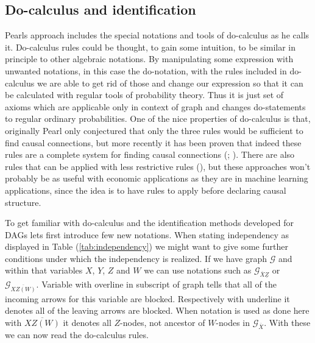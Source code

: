 \documentclass[main=english,12pt,a4paper,pdftex,econ,utf8]{aaltothesis}
\newcommand{\g}{\mathcal{G}}
\begin{document}
\subsection{Do-calculus and identification}

Pearls approach includes the special notations and tools of do-calculus as he calls it. Do-calculus rules could be thought, to gain some intuition, to be similar in principle to other algebraic notations. By manipulating some expression with unwanted notations, in this case the do-notation, with the rules included in do-calculus we are able to get rid of those and change our expression so that it can be calculated with regular tools of probability theory. Thus it is just set of axioms which are applicable only in context of graph and changes do-statements to regular ordinary probabilities. One of the nice properties of do-calculus is that, originally Pearl only conjectured that only the three rules would be sufficient to find causal connections, but more recently it has been proven that indeed these rules are a complete system for finding causal connections (\cite{Shpitser2006}; \cite{Huang2006}). There are also rules that can be applied with less restrictive rules (\cite{Hyttinen2015}), but these approaches won't probably be as useful with economic applications as they are in machine learning applications, since the idea is to have rules to apply before declaring causal structure.

To get familiar with do-calculus and the identification methods developed for DAGs lets first introduce few new notations. When stating independency as displayed in Table (\ref{tab:independency}) we might want to give some further conditions under which the independency is realized. If we have graph $\g$ and within that variables $X$, $Y$, $Z$ and $W$ we can use notations such as $\g_{\overline{X}\underline{Z}}$ or $\g_{\overline{XZ(W)}}$. Variable with overline in subscript of graph tells that all of the incoming arrows for this variable are blocked. Respectively with underline it denotes all of the leaving arrows are blocked. When notation is used as done here with $\overline{XZ(W)}$ it denotes all $Z$-nodes, not ancestor of $W$-nodes in $\g_{\overline{X}}$. With these we can now read the do-calculus rules.
\end{document}
